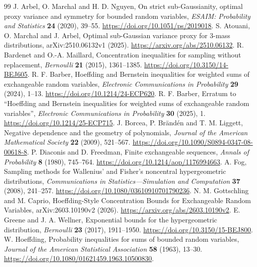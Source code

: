 \documentclass[11pt,a4paper]{article}
\begin{document}
\begin{thebibliography}{99}\setlength{\itemsep}{3pt}
 J. Arbel, O. Marchal and H. D. Nguyen, On strict sub-Gaussianity, optimal proxy variance and symmetry for bounded random variables, \emph{ESAIM: Probability and Statistics} \textbf{24} (2020), 39--55. \url{https://doi.org/10.1051/ps/2019018}.
 S. Atouani, O. Marchal and J. Arbel, Optimal sub-Gaussian variance proxy for 3-mass distributions, arXiv:2510.06132v1 (2025). \url{https://arxiv.org/abs/2510.06132}.
 R. Bardenet and O.-A. Maillard, Concentration inequalities for sampling without replacement, \emph{Bernoulli} \textbf{21} (2015), 1361--1385. \url{https://doi.org/10.3150/14-BEJ605}.
 R. F. Barber, Hoeffding and Bernstein inequalities for weighted sums of exchangeable random variables, \emph{Electronic Communications in Probability} \textbf{29} (2024), 1--13. \url{https://doi.org/10.1214/24-ECP620}.
 R. F. Barber, Erratum to ``Hoeffding and Bernstein inequalities for weighted sums of exchangeable random variables'', \emph{Electronic Communications in Probability} \textbf{30} (2025), 1. \url{https://doi.org/10.1214/25-ECP715}.
 J. Borcea, P. Br\"and\'en and T. M. Liggett, Negative dependence and the geometry of polynomials, \emph{Journal of the American Mathematical Society} \textbf{22} (2009), 521--567. \url{https://doi.org/10.1090/S0894-0347-08-00618-8}.
 P. Diaconis and D. Freedman, Finite exchangeable sequences, \emph{Annals of Probability} \textbf{8} (1980), 745--764. \url{https://doi.org/10.1214/aop/1176994663}.
 A. Fog, Sampling methods for Wallenius' and Fisher's noncentral hypergeometric distributions, \emph{Communications in Statistics---Simulation and Computation} \textbf{37} (2008), 241--257. \url{https://doi.org/10.1080/03610910701790236}.
 N. M. Gottschling and M. Caprio, Hoeffding-Style Concentration Bounds for Exchangeable Random Variables, arXiv:2603.10190v2 (2026). \url{https://arxiv.org/abs/2603.10190v2}.
 E. Greene and J. A. Wellner, Exponential bounds for the hypergeometric distribution, \emph{Bernoulli} \textbf{23} (2017), 1911--1950. \url{https://doi.org/10.3150/15-BEJ800}.
 W. Hoeffding, Probability inequalities for sums of bounded random variables, \emph{Journal of the American Statistical Association} \textbf{58} (1963), 13--30. \url{https://doi.org/10.1080/01621459.1963.10500830}.

\end{thebibliography}
\end{document}
